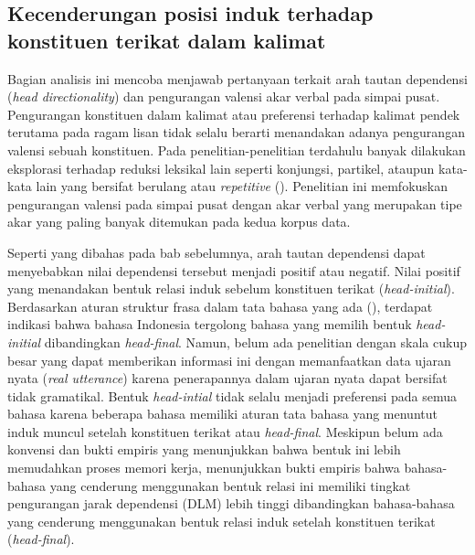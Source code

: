 \subsection{Kecenderungan posisi induk terhadap konstituen terikat dalam kalimat}
Bagian analisis ini mencoba menjawab pertanyaan terkait arah tautan dependensi (\textit{head directionality}) dan pengurangan valensi akar verbal pada simpai pusat. Pengurangan konstituen dalam kalimat atau preferensi terhadap kalimat pendek terutama pada ragam lisan tidak selalu berarti menandakan adanya pengurangan valensi sebuah konstituen. Pada penelitian-penelitian terdahulu banyak dilakukan eksplorasi terhadap reduksi leksikal lain seperti konjungsi, partikel, ataupun kata-kata lain yang bersifat berulang atau \textit{repetitive} (\citealp{jaeger2006redundancy, gildea2015human}). Penelitian ini memfokuskan pengurangan valensi pada simpai pusat dengan akar verbal yang merupakan tipe akar yang paling banyak ditemukan pada kedua korpus data. 

Seperti yang dibahas pada bab sebelumnya, arah tautan dependensi dapat menyebabkan nilai dependensi tersebut menjadi positif atau negatif. Nilai positif yang menandakan bentuk relasi induk sebelum konstituen terikat (\textit{head-initial}). Berdasarkan aturan struktur frasa dalam tata bahasa yang ada (\citealp{kridalaksana2002struktur, sneddon2010indonesian}), terdapat indikasi bahwa bahasa Indonesia tergolong bahasa yang memilih bentuk \textit{head-initial} dibandingkan \textit{head-final}. Namun, belum ada penelitian dengan skala cukup besar yang dapat memberikan informasi ini dengan memanfaatkan data ujaran nyata (\textit{real utterance}) karena penerapannya dalam ujaran nyata dapat bersifat tidak gramatikal. Bentuk \textit{head-intial} tidak selalu menjadi preferensi pada semua bahasa karena beberapa bahasa memiliki aturan tata bahasa yang menuntut induk muncul setelah konstituen terikat atau \textit{head-final}. Meskipun belum ada konvensi dan bukti empiris yang menunjukkan bahwa bentuk ini lebih memudahkan proses memori kerja, \cite{futrell2015large} menunjukkan bukti empiris bahwa bahasa-bahasa yang cenderung menggunakan bentuk relasi ini memiliki tingkat pengurangan jarak dependensi (DLM) lebih tinggi dibandingkan bahasa-bahasa yang cenderung menggunakan bentuk relasi induk setelah konstituen terikat (\textit{head-final}). 

